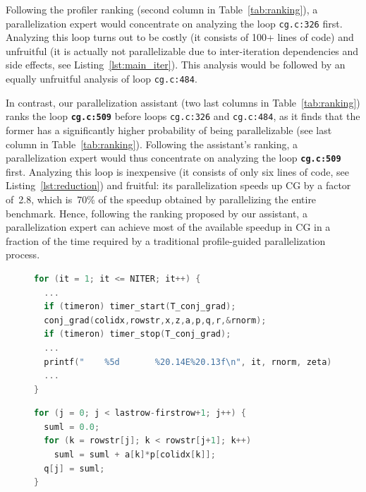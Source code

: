 Following the profiler ranking (second column in Table~\ref{tab:ranking}), a
parallelization expert would concentrate on analyzing the loop \texttt{cg.c:326}
first.
%
%
Analyzing this loop turns out to be costly (it consists of 100+ lines of code)
and unfruitful (it is actually not parallelizable due to inter-iteration
dependencies and side effects, see Listing~\ref{lst:main_iter}).
%
This analysis would be followed by an equally unfruitful analysis of
loop \texttt{cg.c:484}.

In contrast, our parallelization assistant (two last columns in
Table~\ref{tab:ranking}) ranks the loop \textbf{\texttt{cg.c:509}} before
loops \texttt{cg.c:326} and \texttt{cg.c:484}, as it finds that the former has a
significantly higher probability of being parallelizable (see last column in
Table~\ref{tab:ranking}).
%
Following the assistant's ranking, a parallelization expert would thus
concentrate on analyzing the loop \textbf{\texttt{cg.c:509}} first.
%
Analyzing this loop is inexpensive (it consists of only six lines of code, see
Listing~\ref{lst:reduction}) and fruitful: its parallelization speeds up CG by a
factor of~2.8, which is~70\% of the speedup obtained by parallelizing the entire
benchmark.
%
Hence, following the ranking proposed by our assistant, a parallelization expert
can achieve most of the available speedup in CG in a fraction of the time
required by a traditional profile-guided parallelization process.

\begin{figure}[t]
\begin{lstlisting}[caption={\texttt{cg.c:326}. Longest running loop in CG. The loop cannot be parallelized due to
inter-iteration dependences and side effects caused by system calls.},label={lst:main_iter},language=C]
for (it = 1; it <= NITER; it++) {
  ...
  if (timeron) timer_start(T_conj_grad);
  conj_grad(colidx,rowstr,x,z,a,p,q,r,&rnorm);
  if (timeron) timer_stop(T_conj_grad);
  ...
  printf("    %5d       %20.14E%20.13f\n", it, rnorm, zeta);
  ...
}
\end{lstlisting}

\begin{lstlisting}[caption={\textbf{\texttt{cg.c:509}}. Longest running loop in CG among those \emph{that can be parallelized}.},label={lst:reduction},language=C]
for (j = 0; j < lastrow-firstrow+1; j++) {
  suml = 0.0;
  for (k = rowstr[j]; k < rowstr[j+1]; k++)
    suml = suml + a[k]*p[colidx[k]];
  q[j] = suml;
}
\end{lstlisting}
\end{figure}



